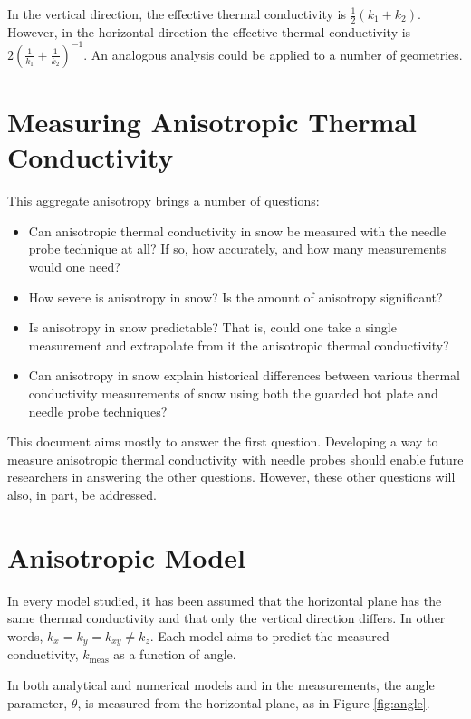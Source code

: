 In the vertical direction, the effective thermal conductivity is
\(\frac12(k_1 + k_2)\). However, in the horizontal direction the effective
thermal conductivity is \(2\left( \frac1{k_1} + \frac1{k_2} \right)^{-1}\). An analogous analysis could be applied to a number of geometries.


\section{Measuring Anisotropic Thermal Conductivity}

This aggregate anisotropy brings a number of questions:

\begin{itemize}
\item Can anisotropic thermal conductivity in snow be measured with the needle
probe technique at all? If so, how accurately, and how many measurements would
one need?
\item How severe is anisotropy in snow? Is the amount of anisotropy
significant?
\item Is anisotropy in snow predictable? That is, could one take a single
measurement and extrapolate from it the anisotropic thermal conductivity?
\item Can anisotropy in snow explain historical differences between various
thermal conductivity measurements of snow using both the guarded hot plate and
needle probe techniques?
\end{itemize}

This document aims mostly to answer the first question. Developing a way
to measure anisotropic thermal conductivity with needle probes should enable
future researchers in answering the other questions. However, these other
questions will also, in part, be addressed.

\section{Anisotropic Model}

In every model studied, it has been assumed that the horizontal plane has the
same thermal conductivity and that only the vertical direction differs. In other
words, \(k_x = k_y = k_{xy} \ne k_z\). Each model aims to predict the measured
conductivity, \(k_{\textrm{meas}}\) as a function of angle.

In both analytical and numerical models and in the measurements, the angle
parameter, \(\theta\), is measured from the horizontal plane, as in Figure 
\ref{fig:angle}.

